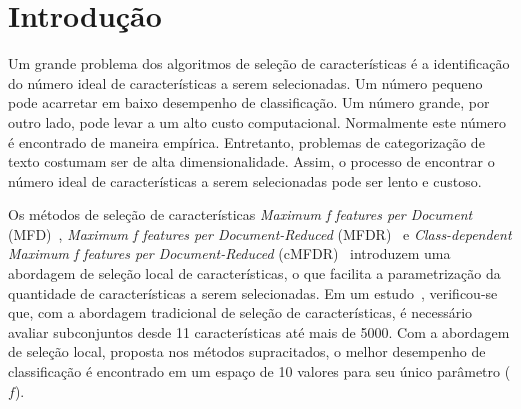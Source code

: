 \documentclass[conference]{IEEEtran}
\begin{document}

\section{Introdução}
\label{sec:intro}

Um grande problema dos algoritmos de seleção de características é a identificação do número ideal de características a serem selecionadas. Um número pequeno pode acarretar em baixo desempenho de classificação. Um número grande, por outro lado, pode levar a um alto custo computacional. Normalmente este número é encontrado de maneira empírica. Entretanto, problemas de categorização de texto costumam ser de alta dimensionalidade. Assim, o processo de encontrar o número ideal de características a serem selecionadas pode ser lento e custoso.

Os métodos de seleção de características \textit{Maximum f features per Document} (MFD)~\cite{mfd2014}, \textit{Maximum f features per Document-Reduced} (MFDR)~\cite{mfd2014} e \textit{Class-dependent Maximum f features per Document-Reduced} (cMFDR)~\cite{fragoso2016cmfdr} introduzem uma abordagem de seleção local de características,  o que facilita a parametrização da quantidade de características a serem selecionadas. Em um estudo~\cite{mfd2014}, verificou-se que, com a abordagem tradicional de seleção de características, é necessário avaliar subconjuntos desde 11 características até mais de 5000. Com a abordagem de seleção local, proposta nos métodos supracitados, o melhor desempenho de classificação é encontrado em um espaço de 10 valores para seu único parâmetro ($f$). 
\end{document}
